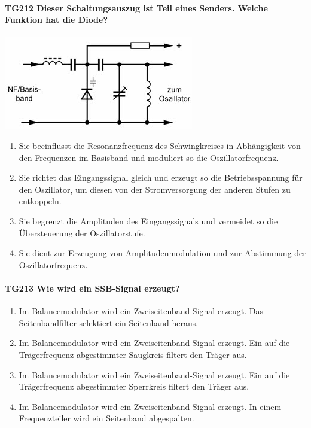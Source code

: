 \documentclass[8pt]{article}
\begin{document}
\paragraph*{TG212 Dieser Schaltungsauszug ist Teil eines Senders. Welche Funktion hat die Diode?}
\begin{center}
	\begin{minipage}{\linewidth}
		\centering
		\includegraphics[scale=1.0]{pics/tg212_a.jpg}
	\end{minipage}
\end{center}
\begin{enumerate}[nolistsep,label=\Alph*]
\item Sie beeinflusst die Resonanzfrequenz des Schwingkreises in Abhängigkeit von den Frequenzen im Basisband und moduliert so die Oszillatorfrequenz.
\item Sie richtet das Eingangssignal gleich und erzeugt so die Betriebsspannung für den Oszillator, um diesen von der Stromversorgung der anderen Stufen zu entkoppeln.
\item Sie begrenzt die Amplituden des Eingangssignals und vermeidet so die Übersteuerung der Oszillatorstufe. 
\item Sie dient zur Erzeugung von Amplitudenmodulation und zur Abstimmung der Oszillatorfrequenz.
\end{enumerate}

\paragraph*{TG213 Wie wird ein SSB-Signal erzeugt?}
\begin{enumerate}[nolistsep,label=\Alph*]
\item Im Balancemodulator wird ein Zweiseitenband-Signal erzeugt. Das Seitenbandfilter selektiert ein Seitenband heraus.
\item Im Balancemodulator wird ein Zweiseitenband-Signal erzeugt. Ein auf die Trägerfrequenz abgestimmter Saugkreis filtert den Träger aus.
\item Im Balancemodulator wird ein Zweiseitenband-Signal erzeugt. Ein auf die Trägerfrequenz abgestimmter Sperrkreis filtert den Träger aus.
\item Im Balancemodulator wird ein Zweiseitenband-Signal erzeugt. In einem Frequenzteiler wird ein Seitenband abgespalten.
\end{enumerate}
\end{document}
